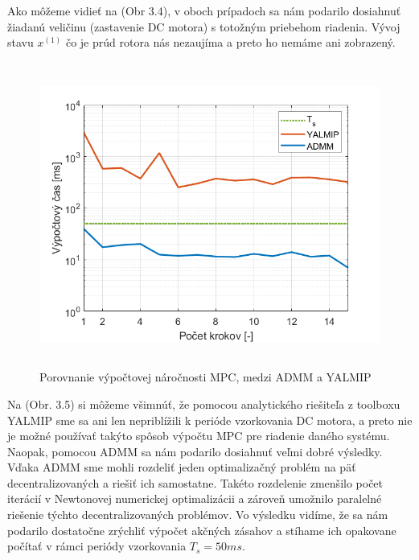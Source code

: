 Ako môžeme vidieť na (Obr 3.4), v oboch prípadoch sa nám podarilo dosiahnuť žiadanú veličinu (zastavenie DC motora) s totožným priebehom riadenia. Vývoj stavu $x^{(1)}$ čo je prúd rotora nás nezaujíma a preto ho nemáme ani zobrazený.
\newpage
\begin{figure}[H]	
	\centering
	\includegraphics[width=13cm,height=10cm]{images/DC_motor/Vypoctovy_cas}
	\caption{Porovnanie výpočtovej náročnosti MPC, medzi ADMM a YALMIP}
	\label{fig9: VN}
\end{figure}
Na (Obr. 3.5) si môžeme všimnúť, že pomocou analytického riešiteľa z toolboxu YALMIP sme sa ani len nepriblížili k perióde vzorkovania DC motora, a preto nie je možné používať takýto spôsob výpočtu MPC pre riadenie daného systému. Naopak, pomocou ADMM sa nám podarilo dosiahnuť veľmi dobré výsledky. Vďaka ADMM sme mohli rozdeliť jeden optimalizačný problém na päť decentralizovaných a riešiť ich samostatne. Takéto rozdelenie zmenšilo počet iterácií v Newtonovej numerickej optimalizácii a zároveň umožnilo paralelné riešenie týchto decentralizovaných problémov. Vo výsledku vidíme, že sa nám podarilo dostatočne zrýchliť výpočet akčných zásahov a stíhame ich opakovane počítať v rámci periódy vzorkovania $T_{s} = 50ms$.